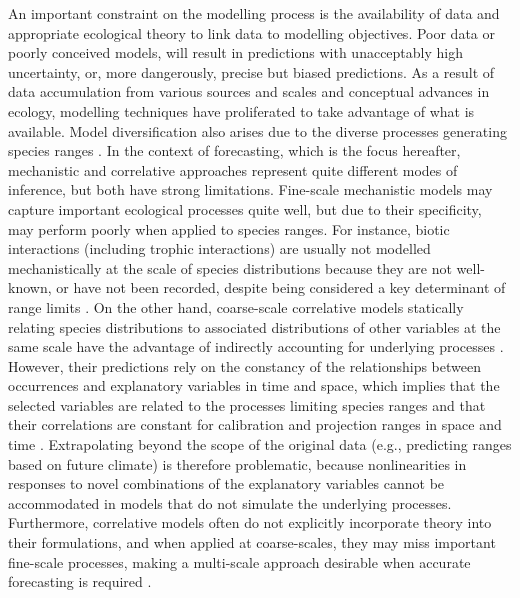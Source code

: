An important constraint on the modelling process is the availability of data and appropriate ecological theory to  link data to modelling objectives.
Poor data or poorly conceived models, will result in predictions with unacceptably high uncertainty, or, more dangerously, precise but biased predictions.
As a result of data accumulation from various sources and scales and conceptual advances in ecology, modelling techniques have proliferated to take advantage of what is available.
Model diversification also arises due to the diverse processes generating species ranges \cite{Soberon2007}.
In the context of forecasting, which is the focus hereafter, mechanistic and correlative approaches represent quite different modes of inference, but both have strong limitations. 
Fine-scale mechanistic models may capture important ecological processes quite well, but due to their specificity, may perform poorly when applied to species ranges.
For instance, biotic interactions (including trophic interactions) are usually not modelled mechanistically at the scale of species distributions because they are not well-known, or have not been recorded, despite being considered a key determinant of range limits \citep{Soberon2007, Roux2012, Guo2013, Pigot2013}. 
On the other hand, coarse-scale correlative models statically relating species distributions to associated distributions of other variables at the same scale have the advantage of indirectly accounting for underlying processes \citep{Guisan2000}.
However, their predictions rely on the constancy of the relationships between occurrences and explanatory variables in time and space, which implies that the selected variables are related to the processes limiting species ranges and that their correlations are constant for calibration and projection ranges in space and time \citep{Dormann2007}. 
Extrapolating beyond the scope of the original data (e.g., predicting ranges based on future climate) is therefore problematic, because nonlinearities in responses to novel combinations of the explanatory variables cannot be accommodated in models that do not simulate the underlying processes.
Furthermore, correlative models often do not explicitly incorporate theory into their formulations, and when applied at coarse-scales, they may miss important fine-scale processes, making a multi-scale approach desirable when accurate forecasting is required \citep{Austin2007, Austin2011, Soranno2014}.

